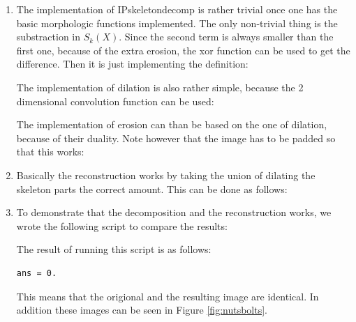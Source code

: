 \documentclass[a4paper]{article}
\begin{document}
\begin{enumerate}
\begin{proof}
\begin{align*}
          &= \left(X - \{z | (\hat{B})_{z} \cap \emptyset \neq \emptyset\}\right) \cup \bigcup_{k = 1}^K \left(\emptyset - \{z | (\hat{B})_{z} \cap \emptyset \neq \emptyset\}\right) \\
          &= \left(X - \{z | \emptyset \neq \emptyset\}\right) \cup \bigcup_{k = 1}^K \left(\emptyset - \{z | \emptyset \neq \emptyset\}\right) \\
          &= \left(X - \emptyset \right) \cup \bigcup_{k = 1}^K \left(\emptyset - \emptyset\right) \\
          &= X \cup \bigcup_{k = 1}^K \emptyset \\
          &= X \cup \emptyset \\
          &= X 
\end{align*}
\end{proof}
\item
The implementation of IPskeletondecomp is rather trivial once one has the basic morphologic functions implemented.
The only non-trivial thing is the substraction in $S_k(X)$.
Since the second term is always smaller than the first one, because of the extra erosion, the xor function can be used to get the difference.
Then it is just implementing the definition:

The implementation of dilation is also rather simple, because the 2 dimensional convolution function can be used:

The implementation of erosion can than be based on the one of dilation, because of their duality.
Note however that the image has to be padded so that this works:

\item
Basically the reconstruction works by taking the union of dilating the skeleton parts the correct amount.
This can be done as follows:

\item
To demonstrate that the decomposition and the reconstruction works, we wrote the following script to compare the results:

The result of running this script is as follows:
\begin{lstlisting}
ans = 0.
\end{lstlisting}
This means that the origional and the resulting image are identical.
In addition these images can be seen in Figure \ref{fig:nutsbolts}.
\begin{figure}[H]
\centering
\begin{tabular}{ccc}

\end{tabular}
\end{figure}
\end{enumerate}
\end{document}
